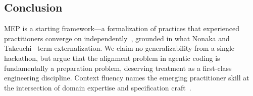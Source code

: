 \subsection{Conclusion}

MEP is a starting framework---a formalization of practices that
experienced practitioners converge on
independently~\cite{huntley2025ralph, horthy2025rpi, yegge2025beads},
grounded in what Nonaka and Takeuchi~\cite{nonaka1995knowledge} term
externalization. We claim no generalizability from a single
hackathon, but argue that the alignment problem in agentic coding is
fundamentally a preparation problem, deserving treatment as a
first-class engineering discipline. Context fluency names the
emerging practitioner skill at the intersection of domain expertise
and specification craft~\cite{anthropic2025context,
github2025speckit}.
